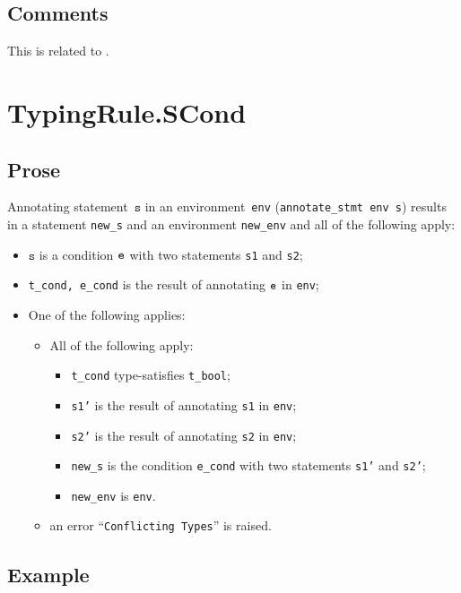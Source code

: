 \documentclass{book}
\newcommand\vs[0]{\texttt{s}}
\begin{document}
\begin{itemize}
\subsection{Comments}
  This is related to .

\section{TypingRule.SCond \label{sec:TypingRule.SCond}}

  \subsection{Prose}
Annotating statement~$\vs$ in an environment~\texttt{env}
(\texttt{annotate\_stmt env s}) results in a statement \texttt{new\_s} and an
environment \texttt{new\_env} and all of the following apply:
   \begin{itemize}
   \item $\vs$ is a condition $\texttt{e}$ with two statements \texttt{s1} and \texttt{s2};
   \item \texttt{t\_cond, e\_cond} is the result of annotating $\texttt{e}$ in \texttt{env};
   \item One of the following applies:
     \begin{itemize}
     \item All of the following apply:
       \begin{itemize}
       \item \texttt{t\_cond} type-satisfies \texttt{t\_bool};
       \item \texttt{s1'} is the result of annotating \texttt{s1} in \texttt{env};
       \item \texttt{s2'} is the result of annotating \texttt{s2} in \texttt{env};
       \item \texttt{new\_s} is the condition \texttt{e\_cond} with two statements \texttt{s1'} and \texttt{s2'};
       \item \texttt{new\_env} is \texttt{env}.
       \end{itemize}
     \item an error ``\texttt{Conflicting Types}'' is raised.
     \end{itemize}
   \end{itemize}

  \subsection{Example}



\end{itemize}
\end{document}
